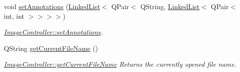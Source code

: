 \begin{DoxyCompactItemize}
void \hyperlink{classImageController_af9c9f284b985c7899a6bc3cf03e49191}{set\+Annotations} (\hyperlink{classLinkedList}{Linked\+List}$<$ Q\+Pair$<$ Q\+String, \hyperlink{classLinkedList}{Linked\+List}$<$ Q\+Pair$<$ int, int $>$$>$$>$$>$)
\begin{DoxyCompactList}\small\item\em \hyperlink{classImageController_af9c9f284b985c7899a6bc3cf03e49191}{Image\+Controller\+::set\+Annotations}. \end{DoxyCompactList}\item 
Q\+String \hyperlink{classImageController_a5f225db05c8ec80017a05494ada72974}{get\+Current\+File\+Name} ()
\begin{DoxyCompactList}\small\item\em \hyperlink{classImageController_a5f225db05c8ec80017a05494ada72974}{Image\+Controller\+::get\+Current\+File\+Name} Returns the currently opened file name. \end{DoxyCompactList}\end{DoxyCompactItemize}
